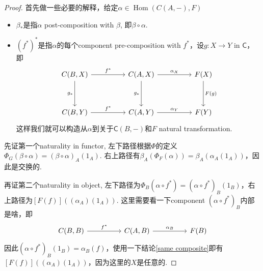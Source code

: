 \documentclass{article}
\newcommand*{\cat}[1]{\textsf{#1}\xspace}
\DeclareMathOperator{\Hom}{Hom}
\begin{document}
\begin{proof}
首先做一些必要的解释，给定$\alpha \in \Hom(C(A,-),F)$
\begin{itemize}
 	\item $\beta_*$是指$\alpha$ post-composition with $\beta$, 即$\beta \circ \alpha$. 
 	\item $(f^*)^*$是指$\alpha$的每个component pre-composition with $f^*$，设$g: X \to Y$ in $\cat{C}$，即
 	$$
\begin{tikzcd}
{C(B,X)} \arrow[rr, "f^*"] \arrow[dd,"g_*"'] &  & {C(A,X)} \arrow[rr, "\alpha_X"] \arrow[dd,"g_*"'] &  & F(X) \arrow[dd,"F(g)"] \\
                                      &  &                                            &  &                 \\
{C(B,Y)} \arrow[rr,"f^*"]                   &  & {C(A,Y)} \arrow[rr,"\alpha_Y"]                        &  & F(Y)           
\end{tikzcd}
 	$$
 	这样我们就可以构造从$\alpha$到关于$\cat{C}(B,-)$和$F$ natural transformation. 
\end{itemize}

先证第一个naturality in functor, 左下路径根据$\Phi$的定义$\Phi_G(\beta \circ \alpha)=(\beta \circ \alpha)_A(1_A)$. 右上路径有$\beta_A(\Phi_F(\alpha)) = \beta_A(\alpha_A(1_A))$，因此是交换的. 

再证第二个naturality in object, 左下路径为$\Phi_B(\alpha \circ f^*) = (\alpha \circ f^*)_B(1_B)$，右上路径为$[F(f)]((\alpha_A)(1_A))$. 这里需要看一下component $(\alpha \circ f^*)_B$内部是啥，即
$$
\begin{tikzcd}
{C(B,B)} \arrow[rr, "f^*"] &  & {C(A,B)} \arrow[rr, "\alpha_B"] &  & F(B)
\end{tikzcd}
$$
因此$(\alpha \circ f^*)_B(1_B) = \alpha_B(f)$，使用一下结论\ref{same composite}即有$[F(f)]((\alpha_A)(1_A))$，因为这里的$X$是任意的. 
\end{proof}
\end{document}
